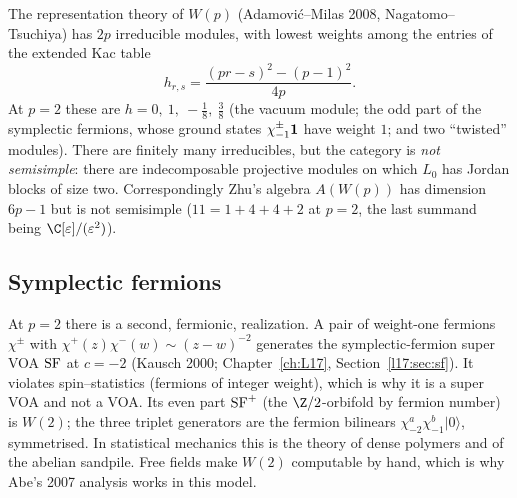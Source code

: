 The representation theory of $W(p)$ (Adamovi\'c--Milas 2008, Nagatomo--Tsuchiya) has $2p$
irreducible modules, with lowest weights among the entries of the extended Kac table
\begin{equation}\label{l18:eq:kac}
h_{r,s}=\frac{(pr-s)^2-(p-1)^2}{4p}.
\end{equation}
At $p=2$ these are $h=0,\ 1,\ -\tfrac18,\ \tfrac38$ (the vacuum module; the odd part of the symplectic fermions, whose ground states $\chi^\pm_{-1}\mathbf{1}$ have weight $1$; and two ``twisted'' modules). There are finitely many irreducibles,
but the category is \emph{not semisimple}: there are indecomposable projective modules on which
$L_0$ has Jordan blocks of size two. Correspondingly Zhu's algebra $A(W(p))$ has dimension $6p-1$
but is not semisimple ($11=1+4+4+2$ at $p=2$, the last summand being $\C[\varepsilon]/(\varepsilon^2)$).

\subsection{Symplectic fermions}
At $p=2$ there is a second, fermionic, realization. A pair of weight-one fermions $\chi^\pm$ with
$\chi^+(z)\chi^-(w)\sim(z-w)^{-2}$ generates the symplectic-fermion super VOA $\mathrm{SF}$ at
$c=-2$ (Kausch 2000; Chapter~\ref{ch:L17}, Section~\ref{l17:sec:sf}). It violates spin--statistics
(fermions of integer weight), which is why it is a super VOA and not a VOA. Its even part
$\mathrm{SF}^+$ (the $\Z/2$-orbifold by fermion number) is $W(2)$; the three triplet generators are
the fermion bilinears $\chi^a_{-2}\chi^b_{-1}|0\rangle$, symmetrised. In statistical mechanics this is
the theory of dense polymers and of the abelian sandpile. Free fields make $W(2)$ computable by
hand, which is why Abe's 2007 analysis works in this model.

